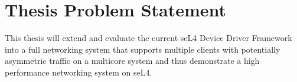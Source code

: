 \section{Thesis Problem Statement}
This thesis will extend and evaluate the current seL4 Device Driver Framework 
into a full networking system that supports multiple clients with potentially asymmetric traffic 
on a multicore system and thus demonstrate a high performance networking system on seL4. 
